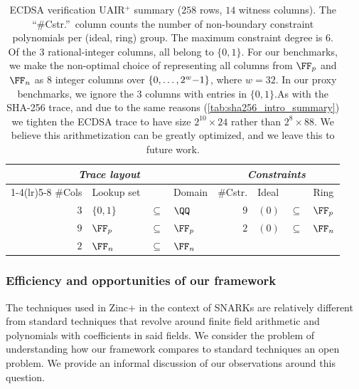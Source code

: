 \begin{table}[H]
\centering
\begin{tabular}{rl@{\;}c@{\;}l|rl@{\;}c@{\;}l}
\toprule
\multicolumn{4}{c|}{\emph{Trace layout}} & \multicolumn{4}{c}{\emph{Constraints}} \\
\cmidrule(lr){1-4}\cmidrule(lr){5-8}
\#Cols & Lookup set & & Domain & \#Cstr. & Ideal & & Ring\\
\midrule
$3$ & $\{0,1\}$ & $\subseteq$ & $\QQ$
& $9$ & $(0)$ & $\subseteq$ & $\FF_p$ \\
$9$ & $\FF_p$ & $\subseteq$ & $\FF_p$
& $2$ & $(0)$ & $\subseteq$ & $\FF_n$ \\
$2$ & $\FF_n$ & $\subseteq$ & $\FF_n$
&\\
\bottomrule
\end{tabular}
\caption{ ECDSA verification UAIR${}^+$ summary ($258$ rows, $14$ witness columns).  The ``\#Cstr.''\ column counts the number of non-boundary constraint polynomials per (ideal, ring) group. The maximum constraint degree is $6$. Of the $3$ rational-integer columns, all belong to $\{0,1\}$. \newline For our benchmarks, we make the non-optimal choice of representing all columns from $\FF_p$ and $\FF_n$ as $8$ integer columns over $\range{0}{2^w{-}1}$, where $w=32$. In our proxy benchmarks, we ignore the $3$ columns with entries in $\{0,1\}$.\newline As with the SHA-256 trace, and due to the same reasons (\cref{tab:sha256_intro_summary}) we tighten the ECDSA trace to have size $2^{10} \times 24$ rather than $2^8 \times 88$. \newline We believe this arithmetization can be greatly optimized, and we leave this to future work.}
\label{tab:ecdsa_intro_summary}
\end{table}



\subsubsection{Efficiency and opportunities of our framework}\label{ss:zinc-efficiency-discussion}
The techniques used in Zinc+ in the context of SNARKs are relatively different from standard techniques that revolve around finite field arithmetic and polynomials with coefficients in said fields. We consider the problem of understanding how our framework compares to standard techniques an open problem. We provide an informal discussion of our observations around this question.

